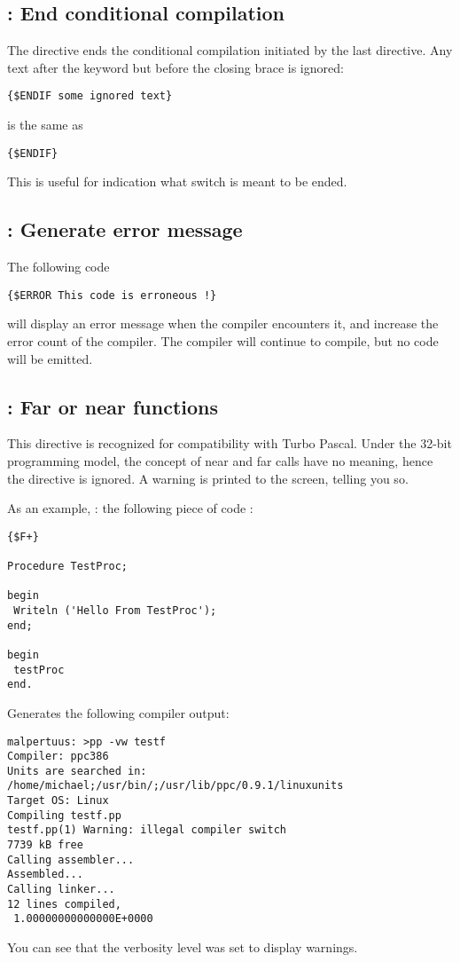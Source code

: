 \documentclass{report}
\begin{document}
\subsection{ : End conditional compilation}

The  directive ends the conditional compilation initiated by the
last  directive. Any text after the  keyword but
before the closing brace is ignored:
\begin{verbatim}
{$ENDIF some ignored text}
\end{verbatim}
is the same as
\begin{verbatim}
{$ENDIF}
\end{verbatim}
This is useful for indication what switch is meant to be ended.

\subsection{ : Generate error message}

The following code
\begin{verbatim}
{$ERROR This code is erroneous !}
\end{verbatim}
will display an error message when the compiler encounters it, 
and increase the error count of the compiler. 
The compiler will continue to compile, but no code will be emitted.

\subsection{ : Far or near functions}
This directive is recognized for compatibility with Turbo Pascal. Under the
32-bit programming model, the concept of near and far calls have no meaning,
hence the directive is ignored. A warning is printed to the screen, telling
you so.

As an example, : the following piece of code :
\begin{verbatim}
{$F+}

Procedure TestProc;

begin
 Writeln ('Hello From TestProc');
end;

begin
 testProc
end.
\end{verbatim}
Generates the following compiler output:
\begin{verbatim}
malpertuus: >pp -vw testf
Compiler: ppc386
Units are searched in: /home/michael;/usr/bin/;/usr/lib/ppc/0.9.1/linuxunits
Target OS: Linux
Compiling testf.pp
testf.pp(1) Warning: illegal compiler switch
7739 kB free
Calling assembler...
Assembled...
Calling linker...
12 lines compiled,
 1.00000000000000E+0000
\end{verbatim}
You can see that the verbosity level was set to display warnings.
\end{document}

